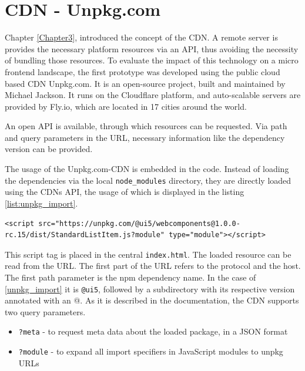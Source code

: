 \section{CDN - Unpkg.com} 

Chapter \ref{Chapter3}, introduced the concept of the CDN. A remote server is provides the necessary platform resources via an API, thus avoiding the necessity of bundling those resources.
To evaluate the impact of this technology on a micro frontend landscape, the first prototype was developed using the public cloud based CDN Unpkg.com. It is an open-source project, built and maintained by Michael Jackson. It runs on the Cloudflare platform, and auto-scalable servers are provided by Fly.io, which are located in 17 cities around the world.\cite{unpkg_doc}

An open API is available, through which resources can be requested. Via path and query parameters in the URL, necessary information like the dependency version can be provided.

The usage of the Unpkg.com-CDN is embedded in the code. Instead of loading the dependencies via the local \texttt{node\_modules} directory, they are directly loaded using the CDNs API, the usage of which is displayed in the listing \ref{list:unpkg_import}.

\begin{lstlisting}[caption=Import of a dependecy using the unpkg API, label=list:unpkg_import]
	<script src="https://unpkg.com/@ui5/webcomponents@1.0.0-rc.15/dist/StandardListItem.js?module" type="module"></script>
\end{lstlisting}

This script tag is placed in the central \texttt{index.html}. The loaded resource can be read from the URL. The first part of the URL refers to the protocol and the host. The first path parameter is the npm dependency name. In the case of \ref{unpkg_import} it is \texttt{@ui5}, followed by a subdirectory with its respective version annotated with an @.
As it is described in the documentation, the CDN supports two query parameters.

\begin{itemize}[noitemsep]
	\item \texttt{?meta} - to request meta data about the loaded package, in a JSON format
	\item \texttt{?module} - to expand all import specifiers in JavaScript modules to unpkg URLs
\end{itemize}

